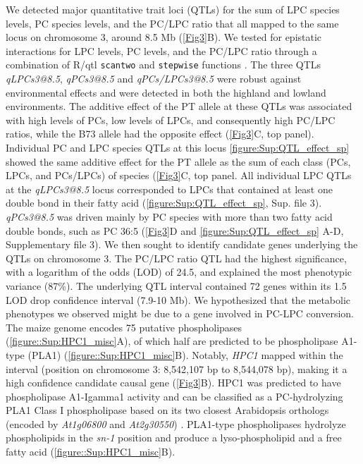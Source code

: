 \documentclass[9pt,twocolumn,twoside,lineno]{biorxiv}
\def\code#1{\texttt{#1}}
\newcommand{\hpc}{\textit{HPC1}\xspace}
\begin{document}
We detected major quantitative trait loci (QTLs) for the sum of LPC species levels, PC species levels, and the PC/LPC ratio that all mapped to the same locus on chromosome 3, around 8.5 Mb (\cref{Fig3}B). 
We tested for epistatic interactions for LPC levels, PC levels, and the PC/LPC ratio through a combination of R/qtl \code{scantwo} and \code{stepwise} functions \cite{Broman2003-ac}.
The three QTLs \textit{qLPCs3@8.5}, \textit{qPCs3@8.5} and \textit{qPCs/LPCs3@8.5} were robust against environmental effects and were detected in both the highland and lowland environments.
The additive effect of the PT allele at these QTLs was associated with high levels of PCs, low levels of LPCs, and consequently high PC/LPC ratios, while the B73 allele had the opposite effect (\cref{Fig3}C, top panel).
Individual PC and LPC species QTLs at this locus \cref{figure:Sup:QTL_effect_sp} showed the same additive effect for the PT allele as the sum of each class (PCs, LPCs, and PCs/LPCs) of species (\cref{Fig3}C, top panel. 
All individual LPC QTLs at the \textit{qLPCs3@8.5} locus corresponded to LPCs that contained at least one double bond in their fatty acid (\cref{figure:Sup:QTL_effect_sp}, Sup. file 3).
\textit{qPCs3@8.5} was driven mainly by PC species with more than two fatty acid double bonds, such as PC 36:5 (\cref{Fig3}D and \cref{figure:Sup:QTL_effect_sp} A-D, Supplementary file 3).
We then sought to identify candidate genes underlying the QTLs on chromosome 3.
The PC/LPC ratio QTL had the highest significance, with a logarithm of the odds (LOD) of 24.5, and explained the most phenotypic variance (87\%). 
The underlying QTL interval contained 72 genes within its 1.5 LOD drop confidence interval (7.9-10 Mb). 
We hypothesized that the metabolic phenotypes we observed might be due to a gene involved in PC-LPC conversion.  
The maize genome encodes 75 putative phospholipases (\cref{figure::Sup:HPC1_misc}A), of which half are predicted to be phospholipase A1-type (PLA1) (\cref{figure::Sup:HPC1_misc}B).  
Notably, \hpc mapped within the interval (position on chromosome 3: 8,542,107 bp to 8,544,078 bp), making it a high confidence candidate causal gene (\cref{Fig3}B). 
HPC1 was predicted to have phospholipase A1-Igamma1 activity and can be classified as a PC-hydrolyzing PLA1 Class I phospholipase based on its two closest Arabidopsis orthologs (encoded by \textit{At1g06800} and \textit{At2g30550}) \cite{Ryu2004-iv}. 
PLA1-type phospholipases hydrolyze phospholipids in the \textit{sn-1} position and produce a lyso-phospholipid and a free fatty acid (\cref{figure::Sup:HPC1_misc}B). 
\end{document}
